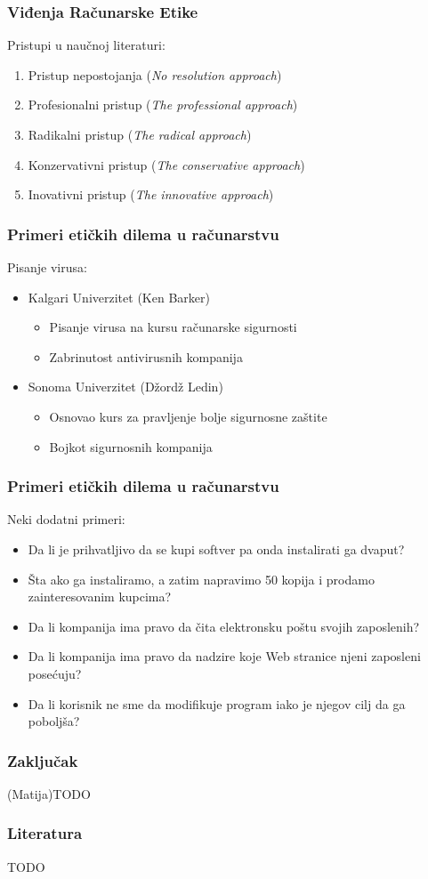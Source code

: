\documentclass[pdf]{beamer}
\begin{document}
\begin{frame}
\frametitle{Viđenja Računarske Etike}

	Pristupi u naučnoj literaturi:
	\begin{enumerate}
	\item Pristup nepostojanja (\textit{No resolution approach})
	\item Profesionalni pristup (\textit{The professional approach})
	\item Radikalni pristup (\textit{The radical approach})
	\item Konzervativni pristup (\textit{The conservative approach})
	\item Inovativni pristup (\textit{The innovative approach})
	\end{enumerate}
	\end{frame}


\begin{frame}
\frametitle{Primeri etičkih dilema u računarstvu}
		Pisanje virusa:
		\begin{itemize}
		\item Kalgari Univerzitet (Ken Barker)
			\begin{itemize}
			\item Pisanje virusa na kursu računarske sigurnosti
			\item Zabrinutost antivirusnih kompanija 
			\end{itemize}
		
		\item Sonoma Univerzitet (Džordž Ledin)
			\begin{itemize}
			\item Osnovao kurs za pravljenje bolje sigurnosne zaštite
			\item Bojkot sigurnosnih kompanija
			\end{itemize}
		\end{itemize}
\end{frame}

\begin{frame}
\frametitle{Primeri etičkih dilema u računarstvu}
	Neki dodatni primeri:
	\begin{itemize}
	\item Da li je prihvatljivo da se kupi softver pa onda instalirati ga dvaput?
	\item Šta ako ga instaliramo, a zatim napravimo 50 kopija i prodamo zainteresovanim kupcima?
	\item Da li kompanija ima pravo da čita elektronsku poštu svojih zaposlenih?
	\item Da li kompanija ima pravo da nadzire koje Web stranice njeni zaposleni posećuju?
	\item Da li korisnik ne sme da modifikuje program iako je njegov cilj da ga poboljša?
	\end{itemize}
\end{frame}

\begin{frame}
\frametitle{Zaključak}
	(Matija)TODO
	\end{frame}


\begin{frame}
\frametitle{Literatura}
	TODO
	\end{frame}
\end{document}
